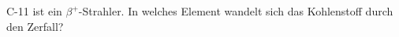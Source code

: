 \documentclass[12pt,a4paper,twoside]{article}
\begin{document}
%
%
%
%
%
%
%
%
%
%
%
%
%
%
%
%
%
%
%
%
%
%
%
%
%
%
%
%
%
%
%
%
\begin{aufgabe}
	C-11 ist ein $\beta^{+}$-Strahler. In welches Element wandelt sich das Kohlenstoff durch den Zerfall?
\end{aufgabe}
\end{document}
